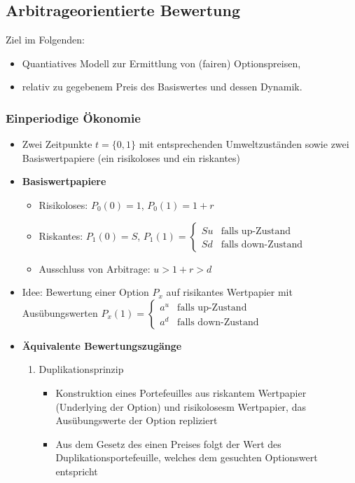 \subsection{Arbitrageorientierte Bewertung}
Ziel im Folgenden:
\begin{itemize}
	\item Quantiatives Modell zur Ermittlung von (fairen) Optionspreisen,
	\item relativ zu gegebenem Preis des Basiswertes und dessen Dynamik.
\end{itemize}

\subsubsection{Einperiodige Ökonomie}
\begin{itemize}
	\item Zwei Zeitpunkte \(t=\{0,1\}\) mit entsprechenden Umweltzuständen sowie zwei Basiswertpapiere (ein risikoloses und ein riskantes)
	\item \textbf{Basiswertpapiere}
	\begin{itemize}
		\item Risikoloses: \(P_0(0)=1\), \(P_0(1)=1+r\)
		\item Riskantes: \(P_1(0)=S\), \(P_1(1)=\begin{cases}Su& \text{falls up-Zustand} \\Sd&\text{falls down-Zustand}\end{cases}\)
		\item Ausschluss von Arbitrage: \(u>1+r>d\)
	\end{itemize}
	\item Idee: Bewertung einer Option \(P_x\) auf risikantes Wertpapier mit Ausübungswerten \(P_x(1)=\begin{cases}a^u& \text{falls up-Zustand} \\a^d&\text{falls down-Zustand}\end{cases}\)
	\item \textbf{Äquivalente Bewertungszugänge}
	\begin{enumerate}
		\item Duplikationsprinzip
		\begin{itemize}
			\item Konstruktion eines Portefeuilles aus riskantem Wertpapier (Underlying der Option) und risikolosesm Wertpapier, das Ausübungswerte der Option repliziert
			\item Aus dem Gesetz des einen Preises folgt der Wert des Duplikationsportefeuille, welches dem gesuchten Optionswert entspricht

\end{itemize}
\end{enumerate}
\end{itemize}
